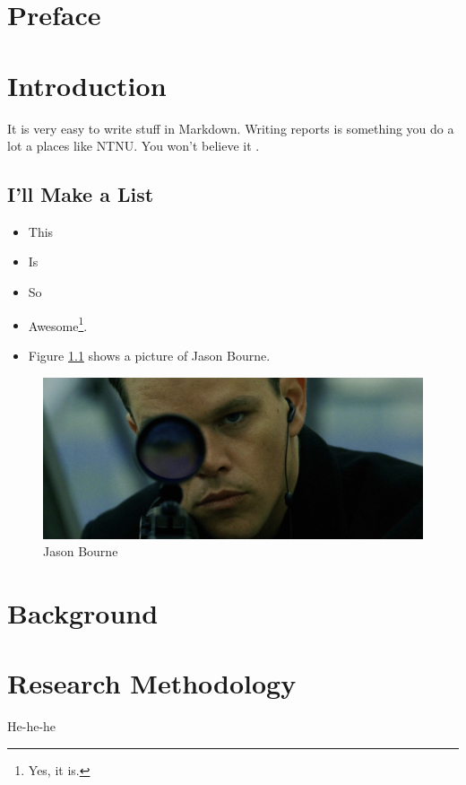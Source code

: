 \documentclass[b5paper,twoside]{book}
\providecommand{\tightlist}{%
  \setlength{\itemsep}{0pt}\setlength{\parskip}{0pt}}
\begin{document}
\chapter*{Preface}


\tableofcontents
{}
\clearpage

\listoftables
{}
\clearpage

\listoffigures
{}
\clearpage

\printglossaries
\clearpage


\chapter{Introduction}\label{introduction}

It is very easy
to write stuff
in Markdown.
Writing reports
is something you
do a lot a
places like
\gls{NTNU}. You
won't believe it
\citep{vg}.

\section{I'll
Make a
List}\label{ill-make-a-list}

\begin{itemize}
\tightlist
\item
  This
\item
  Is
\item
  So
\item
  Awesome\footnote{Yes,
    it is.}.
\item
  Figure
  \ref{bourne}
  shows a
  picture of
  Jason Bourne.
\end{itemize}

\begin{figure}
\centering
\includegraphics{images/jason-bourne.jpg}
\caption{Jason
Bourne\label{bourne}}
\end{figure}

\chapter{Background}\label{background}

\chapter{Research
Methodology}\label{research-methodology}

He-he-he

\renewcommand\bibname{Bibliography}


\end{document}
